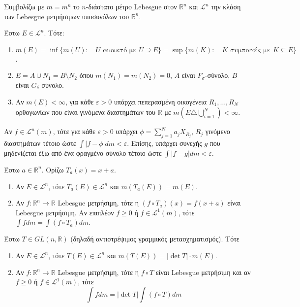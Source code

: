  Συμβολίζω με $m = m^n$ το $n$-διάστατο μέτρο Lebesgue στον $\mathbb R^n$ και $\mathcal L^n$ την κλάση των Lebesgue μετρήσιμων υποσυνόλων του $\mathbb R^n$.

\begin{theorem}
    Έστω $E \in \mathcal L^n$. Τότε:
    \begin{enumerate}
        \item $m(E) = \inf \{ m(U):\quad U \textrm{ ανοικτό με } U \supseteq E \} = \sup \{ m(K): \quad K \textrm{ συμπαγές με } K\subseteq E\}$.
        \item $ E = A\cup N_1 = B \setminus N_2$ όπου $m(N_1) = m(N_2) = 0$, $A$ είναι $F_{\sigma}$-σύνολο, $B$ είναι $G_{\delta}$-σύνολο.
        \item Αν $m(E) < \infty$, για κάθε $\varepsilon >0$ υπάρχει πεπερασμένη οικογένεια ${R_1,\ldots, R_N}$ ορθογωνίων που είναι γινόμενα διαστημάτων του $\mathbb{R}$ με $m(E \triangle \bigcup_{i=1}^N) <\infty$.
        
    \end{enumerate}
\end{theorem}

\begin{theorem}
    Αν  $f\in \mathcal{L}^n(m)$, τότε για κάθε $\varepsilon >0$ υπάρχει $\phi = \sum_{j=1}^N a_j X_{R_j}$, $R_j$ γινόμενο διαστημάτων τέτοιο ώστε $\int |f-\phi|dm < \varepsilon$. Επίσης, υπάρχει συνεχής $g$ που μηδενίζεται έξω από ένα φραγμένο σύνολο τέτοιο ώστε $\int |f-g|dm <\varepsilon$.

\end{theorem}

\begin{theorem} Έστω $a \in \mathbb{R}^n$. Ορίζω $T_a (x) = x+a$.
    \begin{enumerate}
        \item Αν $E \in \mathcal{L}^n$, τότε $T_a (E) \in \mathcal{L}^n$ και $m(T_a(E)) = m(E)$.
        \item Αν $f : \mathbb R^n \rightarrow \mathbb{R}$ Lebesgue μετρήσιμη, τότε η $(f \circ T_a)(x) = f(x+a)$ είναι Lebesgue μετρήσιμη. Αν επιπλέον $f \geq 0$ ή $f \in \mathcal L^1(m)$, τότε $\int f dm = \int (f\circ T_a) dm$.
        
    \end{enumerate}
\end{theorem}

\begin{theorem}
    Έστω $T \in GL(n,\mathbb{R})$ (δηλαδή αντιστρέψιμος γραμμικός μετασχηματισμός). Τότε
    \begin{enumerate}
        \item Αν $E \in \mathcal{L}^n$, τότε $T(E) \in \mathcal L^n$ και $m(T(E)) = |\det T| \cdot m(E)$.
        \item Αν $f: \mathbb{R}^n \rightarrow \mathbb{R}$ Lebesgue μετρήσιμη, τότε η $f\circ T$ είναι Lebesgue μετρήσιμη και αν $f\geq 0$ ή $f \in \mathcal L^1 (m)$, τότε 
        $$\int f dm = |\det T| \int (f\circ T) dm$$
    \end{enumerate}
\end{theorem}


